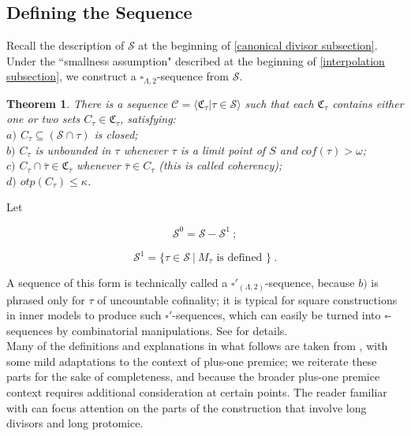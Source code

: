\documentclass[12pt]{article}
\newtheorem{thm}{Theorem}[section]
\begin{document}
\subsection{Defining the Sequence}


Recall the description of $\mathcal{S}$ at the beginning of \ref{canonical divisor subsection}.  Under the ``smallness assumption" described at the beginning of \ref{interpolation subsection}, we construct a $\square_{\Lambda , 2}$-sequence from $\mathcal{S}$.\\

\begin{thm}
There is a sequence $\mathcal{C} = \langle \mathfrak{C}_\tau | \tau \in \mathcal{S} \rangle$ such that each $\mathfrak{C}_\tau$ contains either one or 
two sets $C_\tau \in \mathfrak{C}_\tau$, satisfying:\\

\indent $a)$ $C_\tau \subseteq ( \mathcal{S} \cap \tau )$ is closed;\\

\indent $b)$ $C_\tau$ is unbounded in $\tau$ whenever $\tau$ is a limit point of $S$ and $cof(\tau) > \omega$;\\

\indent $c)$ $C_\tau \cap \bar{\tau} \in \mathfrak{C}_{\bar{\tau}}$ whenever $\bar{\tau} \in C_\tau$ (this is called coherency);\\

\indent $d)$ $otp (C_\tau ) \leq \kappa$.
\end{thm}

\bigskip

Let

\[
\mathcal{S}^0 = \mathcal{S} - \mathcal{S}^1 \ ;
\]

\[
\mathcal{S}^1 = \{ \tau \in \mathcal{S} \ | \ M_\tau \text{ is defined } \} \ .
\]

A sequence of this form is technically called a $\square'_{(\Lambda , 2)}$-sequence, because $b)$ is phrased only for $\tau$ of uncountable cofinality; it is typical for square constructions in inner models to produce such $\square'$-sequences, which can easily be turned into $\square$-sequences by combinatorial manipulations.  See \cite{zeman square proof} for details.\\


Many of the definitions and explanations in what follows are taken from \cite{zeman square proof}, with some mild adaptations to the context of plus-one premice; we reiterate these parts for the sake of completeness, and because the broader plus-one premice context requires additional consideration at certain points.  The reader familiar with \cite{zeman square proof} can focus attention on the parts of the construction that involve long divisors and long protomice.\\
\end{document}
